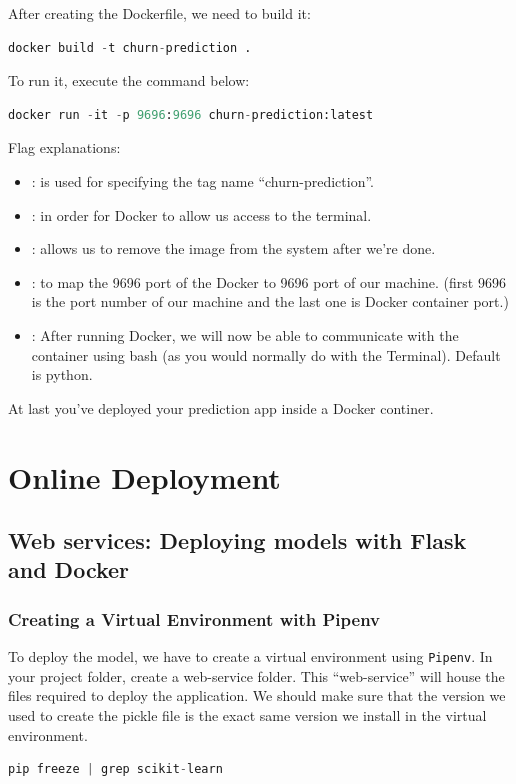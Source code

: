 \documentclass[letterpaper,12pt,notitlepage,twoside]{report}
\begin{document}
After creating the Dockerfile, we need to build it:
\begin{lstlisting}[language=python, numbers=none]
docker build -t churn-prediction .
\end{lstlisting}

To run it, execute the command below:
\begin{lstlisting}[language=python, numbers=none]
docker run -it -p 9696:9696 churn-prediction:latest
\end{lstlisting}

Flag explanations:
\begin{itemize}[noitemsep, topsep=0pt]
\item {}: is used for specifying the tag name ``churn-prediction''.
\item {}: in order for Docker to allow us access to the terminal.
\item {}: allows us to remove the image from the system after we're done.
\item {}: to map the 9696 port of the Docker to 9696 port of our machine. (first 9696 is the port number of our machine and the last one is Docker container port.)
\item {}: After running Docker, we will now be able to communicate with the container using bash (as you would normally do with the Terminal). Default is python.
\end{itemize}

At last you've deployed your prediction app inside a Docker continer. 


\section{Online Deployment}
\subsection{Web services: Deploying models with Flask and Docker}
\subsubsection{Creating a Virtual Environment with Pipenv}
To deploy the model, we have to create a virtual environment using \texttt{Pipenv}. In your project folder, create a web-service folder.  This ``web-service'' will house the files required to deploy the application.  We should make sure that the version we used to create the pickle file is the exact same version we install in the virtual environment.
\begin{lstlisting}[language=python, numbers=none]
 pip freeze | grep scikit-learn
\end{lstlisting}
\end{document}
